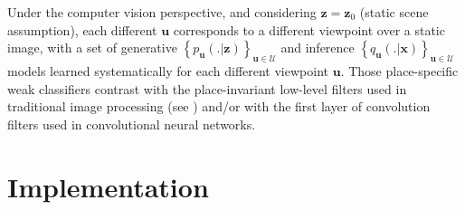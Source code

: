 \documentclass{article}
\begin{document}
Under the computer vision perspective, and considering $\boldsymbol{z} = \boldsymbol{z}_0$ (static scene assumption), each different $\boldsymbol{u}$ corresponds to a different viewpoint over a static image, with a set of generative
$ \left\{p_{\boldsymbol{u}}(.|\boldsymbol{z})\right\}_{\boldsymbol{u}\in\mathcal{U}}$
and inference
$ \left\{q_{\boldsymbol{u}}(.|\boldsymbol{x})\right\}_{\boldsymbol{u}\in\mathcal{U}}$ 
models learned systematically for each different viewpoint $\boldsymbol{u}$. Those place-specific weak classifiers contrast with the place-invariant low-level filters used in traditional image processing (see \cite{viola2003fast}) and/or with the first layer of convolution filters used in convolutional neural networks. %





\section{Implementation}
\end{document}

